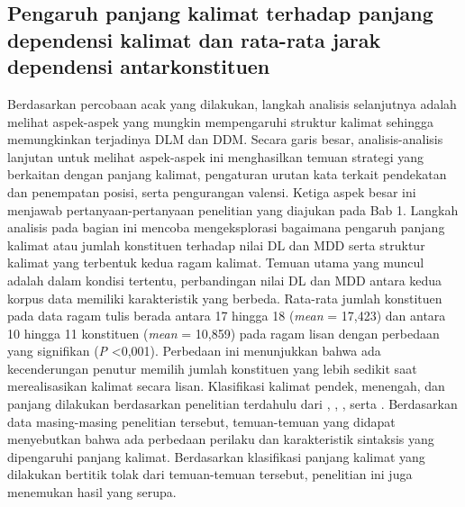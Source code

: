 \subsection{Pengaruh panjang kalimat terhadap panjang dependensi kalimat dan rata-rata jarak dependensi antarkonstituen}
Berdasarkan percobaan acak yang dilakukan, langkah analisis selanjutnya adalah melihat aspek-aspek yang mungkin mempengaruhi struktur kalimat sehingga memungkinkan terjadinya DLM dan DDM. Secara garis besar, analisis-analisis lanjutan untuk melihat aspek-aspek ini menghasilkan temuan strategi yang berkaitan dengan panjang kalimat, pengaturan urutan kata terkait pendekatan dan penempatan posisi, serta pengurangan valensi. Ketiga aspek besar ini menjawab pertanyaan-pertanyaan penelitian yang diajukan pada Bab 1. Langkah analisis pada bagian ini mencoba mengeksplorasi bagaimana pengaruh panjang kalimat atau jumlah konstituen terhadap nilai DL dan MDD serta struktur kalimat yang terbentuk kedua ragam kalimat. Temuan utama yang muncul adalah dalam kondisi tertentu, perbandingan nilai DL dan MDD antara kedua korpus data memiliki karakteristik yang berbeda. Rata-rata jumlah konstituen pada data ragam tulis berada antara 17 hingga 18 (\textit{mean} = 17,423) dan antara 10 hingga 11 konstituen (\textit{mean} = 10,859) pada ragam lisan dengan perbedaan yang signifikan (\textit{P} \textless 0,001). Perbedaan ini menunjukkan bahwa ada kecenderungan penutur memilih jumlah konstituen yang lebih sedikit saat merealisasikan kalimat secara lisan. Klasifikasi kalimat pendek, menengah, dan panjang dilakukan berdasarkan penelitian terdahulu dari \cite{gildea2015human}, \cite{futrell2015large}, \cite{wang2017effects}, serta \cite{liu2017dependency}. Berdasarkan data masing-masing penelitian tersebut, temuan-temuan yang didapat menyebutkan bahwa ada perbedaan perilaku dan karakteristik sintaksis yang dipengaruhi panjang kalimat. Berdasarkan klasifikasi panjang kalimat yang dilakukan bertitik tolak dari temuan-temuan tersebut, penelitian ini juga menemukan hasil yang serupa. 


